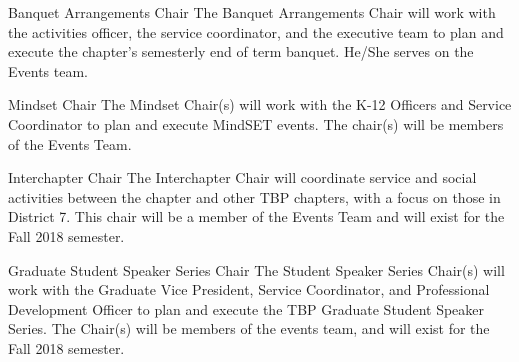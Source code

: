 \begin{enumsubsection}
\item{Banquet Arrangements Chair} The Banquet Arrangements Chair will work with the activities officer, the  service coordinator, and the executive team to plan and execute the chapter's semesterly end of term banquet. He/She serves on the Events team.
\item{Mindset Chair} The Mindset Chair(s) will work with the K-12 Officers and Service Coordinator to plan and execute MindSET events.  The chair(s) will be members of the Events Team.
\item{Interchapter Chair} The Interchapter Chair will coordinate service and social activities between the chapter and other TBP chapters, with a focus on those in District 7. This chair will be a member of the Events Team and will exist for the Fall 2018 semester. 
\item{Graduate Student Speaker Series Chair} The Student Speaker Series Chair(s) will work with the Graduate Vice President, Service Coordinator, and Professional Development Officer to plan and execute the TBP Graduate Student Speaker Series. The Chair(s) will be members of the events team, and will exist for the Fall 2018 semester.


\end{enumsubsection}
